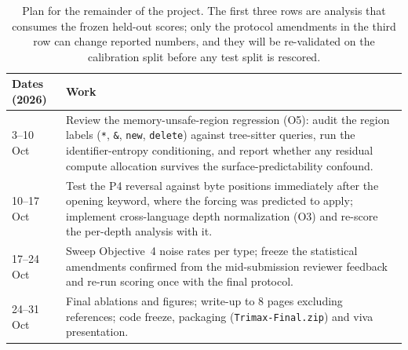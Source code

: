 \begin{table}[h]
\centering
\begin{tabular}{lp{11.2cm}}
\toprule
Dates (2026) & Work \\
\midrule
3--10 Oct & Review the memory-unsafe-region regression (O5): audit the region labels (\texttt{*}, \texttt{\&}, \texttt{new}, \texttt{delete}) against tree-sitter queries, run the identifier-entropy conditioning, and report whether any residual compute allocation survives the surface-predictability confound. \\
10--17 Oct & Test the P4 reversal against byte positions immediately after the opening keyword, where the forcing was predicted to apply; implement cross-language depth normalization (O3) and re-score the per-depth analysis with it. \\
17--24 Oct & Sweep Objective~4 noise rates per type; freeze the statistical amendments confirmed from the mid-submission reviewer feedback and re-run scoring once with the final protocol. \\
24--31 Oct & Final ablations and figures; write-up to 8 pages excluding references; code freeze, packaging (\texttt{Trimax-Final.zip}) and viva presentation. \\
\bottomrule
\end{tabular}
\caption{Plan for the remainder of the project. The first three rows are analysis that consumes the frozen held-out scores; only the protocol amendments in the third row can change reported numbers, and they will be re-validated on the calibration split before any test split is rescored.}
\label{tab:timeline}
\end{table}

